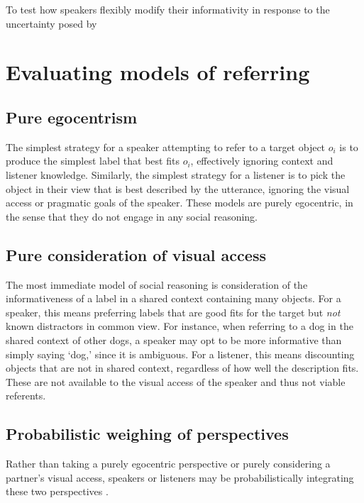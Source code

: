 \documentclass[manuscript]{stjour}
\begin{document}
To test how speakers flexibly modify their informativity in response to the uncertainty posed by 

\section{Evaluating models of referring}

\subsection{Pure egocentrism}

The simplest strategy for a speaker attempting to refer to a target object $o_i$ is to produce the simplest label that best fits $o_i$, effectively ignoring context and listener knowledge.  Similarly, the simplest strategy for a listener is to pick the object in their view that is best described by the utterance, ignoring the visual access or pragmatic goals of the speaker. These models are purely egocentric, in the sense that they do not engage in any social reasoning. 

\subsection{Pure consideration of visual access}

The most immediate model of social reasoning is consideration of the informativeness of a label in a shared context containing many objects. For a speaker, this means preferring labels that are good fits for the target but \emph{not} known distractors in common view. For instance, when referring to a dog in the shared context of other dogs, a speaker may opt to be more informative than simply saying `dog,' since it is ambiguous. For a listener, this means discounting objects that are not in shared context, regardless of how well the description fits. These are not available to the visual access of the speaker and thus not viable referents. 

\subsection{Probabilistic weighing of perspectives}

Rather than taking a purely egocentric perspective or purely considering a partner's visual access, speakers or listeners may be probabilistically integrating these two perspectives \cite{HellerParisienStevenson16_ProbabilisticWeighing}. %
\end{document}
